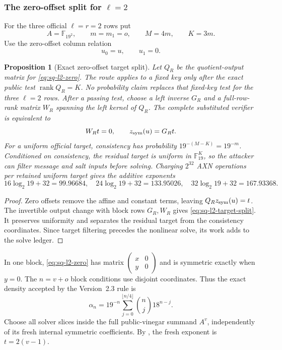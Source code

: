 \documentclass[11pt]{article}
\newtheorem{proposition}[theorem]{Proposition}
\newcommand{\F}{\mathbb F}
\newcommand{\rank}{\operatorname{rank}}
\begin{document}
\subsubsection{The zero-offset split for \texorpdfstring{$\ell=2$}{ell=2}}
\label{sec:sq-l2}

For the three official $\ell=r=2$ rows put
\[
 A=\F_{19^2},\qquad m=m_1=o,\qquad M=4m,\qquad K=3m.
\]
Use the zero-offset column relation
\begin{equation}
 u_0=u,\qquad u_1=0.                                  \label{eq:sq-l2-zero}
\end{equation}

\begin{proposition}[Exact zero-offset target split]
\label{prop:sq-zero-split}
Let $Q_R$ be the quotient-output matrix for \eqref{eq:sq-l2-zero}.  The
route applies to a fixed key only after the exact public test
$\rank Q_R=K$.  No probability claim replaces that fixed-key test for the
three $\ell=2$ rows.  After a passing test, choose a left inverse $G_R$
and a full-row-rank matrix
$W_R$ spanning the left kernel of $Q_R$.  The complete substituted verifier
is equivalent to
\begin{equation}
 W_Rt=0,\qquad z_{\rm sym}(u)=G_Rt.                  \label{eq:sq-l2-target-split}
\end{equation}
For a uniform official target, consistency has probability
$19^{-(M-K)}=19^{-m}$.  Conditioned on consistency, the residual target is
uniform in $\F_{19}^K$, so the attacker can filter message and salt inputs
before solving.  Charging $2^{32}$ AXN operations per retained uniform target
gives the additive exponents
\[
 16\log_2 19+32=99.96684,
 \quad24\log_2 19+32=133.95026,
 \quad32\log_2 19+32=167.93368.
\]
\end{proposition}

\begin{proof}
Zero offsets remove the affine and constant terms, leaving
$Q_Rz_{\rm sym}(u)=t$.  The invertible output change with block rows
$G_R,W_R$ gives \eqref{eq:sq-l2-target-split}.  It preserves uniformity and
separates the residual target from the consistency coordinates.  Since target
filtering precedes the nonlinear solve, its work adds to the solve ledger.
\end{proof}

In one block, \eqref{eq:sq-l2-zero} has matrix
$\left(\begin{smallmatrix}x&0\\y&0\end{smallmatrix}\right)$ and is symmetric
exactly when $y=0$.  The $n=v+o$ block conditions use disjoint coordinates.
Thus the exact density accepted by the Version~2.3 rule is
\begin{equation}
 \alpha_n=19^{-n}\sum_{j=0}^{\lfloor n/4\rfloor}
          \binom nj18^{n-j}.                          \label{eq:sq-l2-alpha}
\end{equation}
Choose all solver slices inside the full public-vinegar summand $A^v$,
independently of its fresh internal symmetric coefficients.  By
, the fresh exponent is
$t=2(v-1)$.
\end{document}
